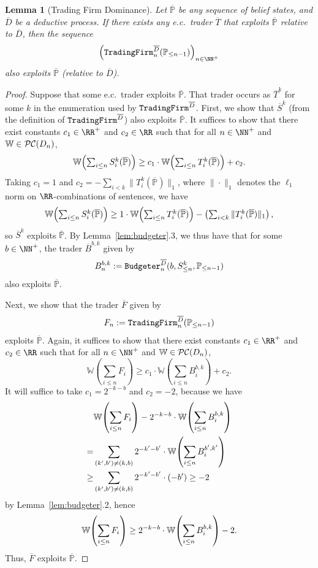 \documentclass[authordate,onecolumn,noenvironments]{miri-tech-article}
\numberwithin{equation}{subsection}
\newtheorem{lemma}[theorem]{Lemma}
\newcommand{\seq}[1]{{\overline{#1}}}
\newcommand{\nn}{n}
\newcommand{\ec}[1][\ ]{e.c.#1}
\newcommand{\trade}{T}%
\newcommand{\Trader}{\seq{\trade}} %
\newcommand{\supertrade}{F}
\newcommand{\budgeter}{\text{\upshape{\texttt{Budgeter}}}\xspace}
\newcommand{\tradingfirm}{\text{\upshape{\texttt{TradingFirm}}}\xspace}
\newcommand{\BelState}{\mathbb{P}}
\newcommand{\pt}{\BelState}
\newcommand{\MP}{\seq{\pt}}
\newcommand{\dt}{D}
\newcommand{\DP}{\seq{\dt}}
\newcommand{\pcworlds}{\mathcal{P\-C}}
\newcommand{\World}{\mathbb{W}}
\begin{document}
\begin{lemma}[Trading Firm Dominance]\label{lem:tfdom}
  Let $\MP$ be any sequence of belief states, and $\DP$ be a deductive process. If there exists any \ec trader $\Trader$ that exploits $\MP$ relative to $\DP$, then the sequence
  \[
    \left(\tradingfirm^\DP_\nn(\pt_{\leq \nn-1})\right)_{\nn\in\NN^+}
  \]
  also exploits $\MP$ (relative to $\DP$).
\end{lemma}

\begin{proof}
  Suppose that some \ec trader exploits $\MP$. That trader occurs as $\seq{\trade}^k$ for some $k$ in the enumeration used by $\tradingfirm^\DP$.  First, we show that $\seq{S}^k$ (from the definition of $\tradingfirm^\DP$) also exploits $\MP$.  It suffices to show that there exist constants $c_1\in\RR^+$ and $c_2\in\RR$ such that for all $n\in\NN^+$ and $\World\in\pcworlds(\dt_\nn)$, 
  \[
    \World\mleft(\textstyle\sum_{i\leq n}S^k_i(\MP)\mright)\geq c_1\cdot \World\mleft(\textstyle\sum_{i\leq n}T^k_i(\MP)\mright)+c_2.
  \]
  Taking $c_1=1$ and $c_2=-\sum_{i<k}\|T^k_i(\MP)\|_1$, where $\|\cdot\|_1$ denotes the $\ell_1$ norm on $\RR$-combinations of sentences, we have 
  \[
    \World\mleft(\textstyle\sum_{i\leq n}S^k_i(\MP)\mright)\geq 1\cdot \World\mleft(\textstyle\sum_{i\leq n}T^k_i(\MP)\mright)- \left(\textstyle\sum_{i<k}\|T^k_i(\MP)\|_1\right),
  \]
  so $\seq{S}^k$ exploits $\MP$.  By Lemma~\ref{lem:budgeter}.3, we thus have that for some $b\in\NN^+$, the trader $\seq{B}^{b,k}$ given by
  \[B^{b,k}_\nn := \budgeter^\DP_\nn(b,S^k_{\leq n},\pt_{\le \nn-1})\]
  also exploits $\MP$.

  Next, we show that the trader $\seq\supertrade$ given by
  \[
    \supertrade_\nn := \tradingfirm^\DP_\nn(\pt_{\le \nn-1})
  \] 
  exploits $\MP$. Again, it suffices to show that there exist constants $c_1\in\RR^+$ and $c_2\in\RR$ such that for all $n\in\NN^+$ and $\World\in\pcworlds(\dt_\nn)$, 
  \[\World\left(\sum_{i\leq n}\supertrade_i\right)\geq c_1\cdot \World\left(\sum_{i\leq n}B^{b,k}_i\right)+c_2.\]
  It will suffice to take $c_1=2^{-k-b}$ and $c_2=-2$, because we have 
  \begin{align*}
    &\World\mleft(\sum_{i\leq n}\supertrade_i\mright)-2^{-k-b}\cdot \World\mleft(\sum_{i\leq n}B^{b,k}_i\mright)\\
    =&\sum_{(k^\prime,b^\prime)\neq(k,b)}2^{-k^\prime-b^\prime}\cdot \World\mleft(\sum_{i\leq n}B^{b^\prime,k^\prime}_i\mright)\\
    \geq& \sum_{(k^\prime,b^\prime)\neq(k,b)}2^{-k^\prime-b^\prime}\cdot (-b^\prime)\geq -2
  \end{align*}
by Lemma~\ref{lem:budgeter}.2,   hence
  \[\World\mleft(\sum_{i\leq n}\supertrade_i\mright)\geq 2^{-k-b}\cdot \World\mleft(\sum_{i\leq n}B^{b,k}_i\mright) -2.\]
  Thus, $\seq\supertrade$ exploits $\MP$.
\end{proof}
\end{document}
